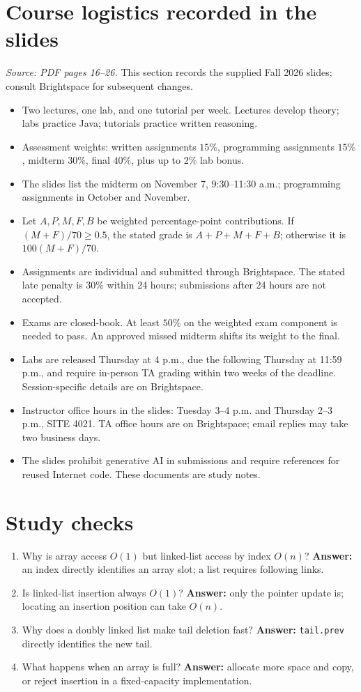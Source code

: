 \documentclass[11pt,letterpaper]{article}
\newcommand{\sourcepages}[1]{\textit{Source: PDF pages #1.}}
\newcommand{\method}[1]{\texttt{#1}}
\begin{document}
\section{Course logistics recorded in the slides}
\sourcepages{16--26}
This section records the supplied Fall 2026 slides; consult Brightspace for subsequent changes.
\begin{itemize}
\item Two lectures, one lab, and one tutorial per week. Lectures develop theory; labs practice Java; tutorials practice written reasoning.
\item Assessment weights: written assignments $15\%$, programming assignments $15\%$, midterm $30\%$, final $40\%$, plus up to $2\%$ lab bonus.
\item The slides list the midterm on November 7, 9:30--11:30 a.m.; programming assignments in October and November.
\item Let $A,P,M,F,B$ be weighted percentage-point contributions. If $(M+F)/70\geq0.5$, the stated grade is $A+P+M+F+B$; otherwise it is $100(M+F)/70$.
\item Assignments are individual and submitted through Brightspace. The stated late penalty is $30\%$ within 24 hours; submissions after 24 hours are not accepted.
\item Exams are closed-book. At least $50\%$ on the weighted exam component is needed to pass. An approved missed midterm shifts its weight to the final.
\item Labs are released Thursday at 4 p.m., due the following Thursday at 11:59 p.m., and require in-person TA grading within two weeks of the deadline. Session-specific details are on Brightspace.
\item Instructor office hours in the slides: Tuesday 3--4 p.m. and Thursday 2--3 p.m., SITE 4021. TA office hours are on Brightspace; email replies may take two business days.
\item The slides prohibit generative AI in submissions and require references for reused Internet code. These documents are study notes.
\end{itemize}

\section{Study checks}
\begin{enumerate}
\item Why is array access $O(1)$ but linked-list access by index $O(n)$? \textbf{Answer:} an index directly identifies an array slot; a list requires following links.
\item Is linked-list insertion always $O(1)$? \textbf{Answer:} only the pointer update is; locating an insertion position can take $O(n)$.
\item Why does a doubly linked list make tail deletion fast? \textbf{Answer:} \method{tail.prev} directly identifies the new tail.
\item What happens when an array is full? \textbf{Answer:} allocate more space and copy, or reject insertion in a fixed-capacity implementation.
\end{enumerate}
\end{document}
